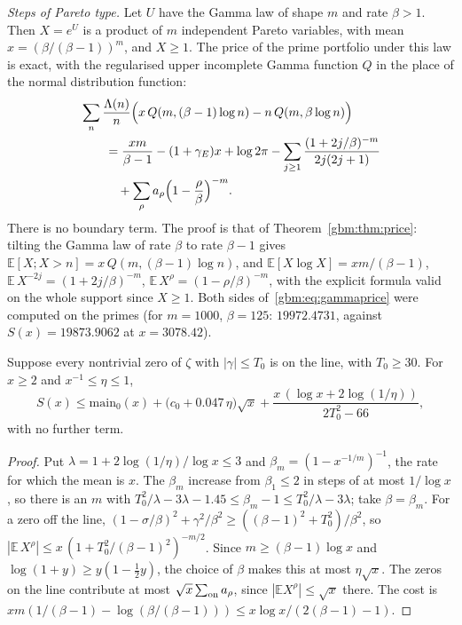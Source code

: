 \emph{Steps of Pareto type.} Let $U$ have the Gamma law of shape $m$ and rate $\beta>1$. Then $X=e^U$ is a product of $m$ independent Pareto variables, with mean $x=(\beta/(\beta-1))^m$, and $X\ge1$. The price of the prime portfolio under this law is exact, with the regularised upper incomplete Gamma function $Q$ in the place of the normal distribution function:
\begin{equation}\label{gbm:eq:gammaprice}
\begin{aligned}
&\sum_n\frac{\Lambda(n)}n\Bigl(x\,Q(m,(\beta-1)\log n)-n\,Q(m,\beta\log n)\Bigr)\\
&\qquad=\frac{xm}{\beta-1}-(1+\gamma_E)x+\log2\pi-\sum_{j\ge1}\frac{(1+2j/\beta)^{-m}}{2j(2j+1)}\\
&\qquad\quad+\sum_\rho a_\rho\Bigl(1-\frac\rho\beta\Bigr)^{-m}.
\end{aligned}
\end{equation}
There is no boundary term. The proof is that of Theorem~\ref{gbm:thm:price}: tilting the Gamma law of rate $\beta$ to rate $\beta-1$ gives $\mathbb E[X;X>n]=x\,Q(m,(\beta-1)\log n)$, and $\mathbb E[X\log X]=xm/(\beta-1)$, $\mathbb E\,X^{-2j}=(1+2j/\beta)^{-m}$, $\mathbb E\,X^\rho=(1-\rho/\beta)^{-m}$, with the explicit formula valid on the whole support since $X\ge1$. Both sides of~\eqref{gbm:eq:gammaprice} were computed on the primes (for $m=1000$, $\beta=125$: $19972.4731$, against $S(x)=19873.9062$ at $x=3078.42$).

\begin{theorem}\label{gbm:thm:gammakernel}
Suppose every nontrivial zero of $\zeta$ with $|\gamma|\le T_0$ is on the line, with $T_0\ge30$. For $x\ge2$ and $x^{-1}\le\eta\le1$,
\[
S(x)\le\mathrm{main}_0(x)+\bigl(c_0+0.047\,\eta\bigr)\sqrt x+\frac{x\,(\log x+2\log(1/\eta))}{2T_0^2-66},
\]
with no further term.
\end{theorem}

\begin{proof}
Put $\lambda=1+2\log(1/\eta)/\log x\le3$ and $\beta_m=(1-x^{-1/m})^{-1}$, the rate for which the mean is $x$. The $\beta_m$ increase from $\beta_1\le2$ in steps of at most $1/\log x$, so there is an $m$ with $T_0^2/\lambda-3\lambda-1.45\le\beta_m-1\le T_0^2/\lambda-3\lambda$; take $\beta=\beta_m$. For a zero off the line, $(1-\sigma/\beta)^2+\gamma^2/\beta^2\ge((\beta-1)^2+T_0^2)/\beta^2$, so $|\mathbb E\,X^\rho|\le x\,(1+T_0^2/(\beta-1)^2)^{-m/2}$. Since $m\ge(\beta-1)\log x$ and $\log(1+y)\ge y(1-\frac12y)$, the choice of $\beta$ makes this at most $\eta\sqrt x$. The zeros on the line contribute at most $\sqrt x\sum_{\rm on}a_\rho$, since $|\mathbb E X^\rho|\le\sqrt x$ there. The cost is $xm(1/(\beta-1)-\log(\beta/(\beta-1)))\le x\log x/(2(\beta-1)-1)$.
\end{proof}

